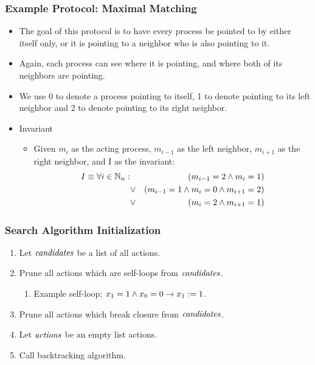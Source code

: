 \documentclass[handout]{beamer}
\begin{document}
\begin{frame}
\frametitle{Example Protocol: Maximal Matching}
\begin{itemize}
\item The goal of this protocol is to have every process be pointed to by either itself only, or it
    is pointing to a neighbor who is also pointing to it.
\item Again, each process can see where it is pointing, and where both of its neighbors are
    pointing.
\item We use 0 to denote a process pointing to itself, 1 to denote pointing to its left neighbor
    and 2 to denote pointing to its right neighbor.
\item Invariant
 \begin{itemize}
 \item Given $m_i$ as the acting process, $m_{i-1}$ as the left neighbor, $m_{i+1}$ as the right
    neighbor, and I as the invariant:
  \begin{eqnarray*}
   I \equiv \forall i\in\mathbb{N}_n: & & (m_{i-1} = 2 \wedge m_i = 1)
                    \\ & \vee  & (m_{i-1} = 1 \wedge m_i = 0 \wedge m_{i+1} = 2)
                    \\ & \vee  & (m_i = 2 \wedge m_{i+1} = 1)
  \end{eqnarray*}
 \end{itemize}
\end{itemize}
\end{frame}

\begin{frame}
\frametitle{Search Algorithm Initialization}
\begin{enumerate}
\item Let $\mathit{candidates}$ be a list of all actions.
\item Prune all actions which are self-loops from $\mathit{candidates}$.
 \begin{enumerate}
 \item[] Example self-loop: $x_1 = 1 \wedge x_0 = 0 \to x_1:= 1$.
 \end{enumerate}
\item Prune all actions which break closure from $\mathit{candidates}$.
\item Let $\mathit{actions}$ be an empty list actions.
\item Call backtracking algorithm.
\end{enumerate}
\end{frame}
\end{document}
